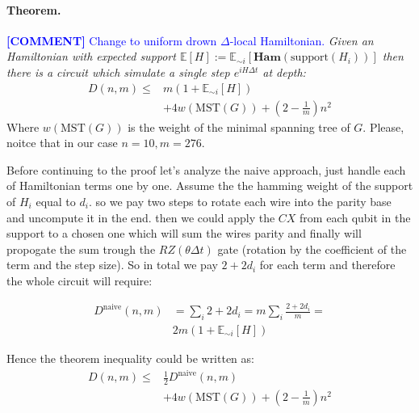 \documentclass{article}
\newcommand{\commentt}[1]{\textcolor{blue}{ \textbf{[COMMENT]} #1}}
\newcommand{\ctt}[1]{\commentt{#1}}
\begin{document}
\paragraph{Theorem.} \ctt{Change to uniform drown $\Delta$-local Hamiltonian.} \textit{ Given an Hamiltonian with expected support \(\mathbb{E}[H] := \mathbb{E}_{\sim i}\left[ \textbf{Ham}( \text{support}(H_i)) \right]\) then there is a circuit which simulate a single step \(e^{iH \Delta t}\) at depth:}
\begin{equation*}
  \begin{split}
    D\left(n,m\right) \leq & m \left( 1 + \mathbb{E}_{\sim i}[H] \right)   \\
    & + 4w \left( \text{MST}\left(G\right) \right) + \left(2 - \frac{1}{m}\right)n^2
  \end{split}    
\end{equation*}  Where  \(w \left( \text{MST}\left(G\right) \right) \) is the weight of the minimal spanning tree of \(G\). Please, noitce that in our case \(n=10, m=276\).

Before continuing to the proof let's analyze the naive approach, just handle each of Hamiltonian terms one by one. Assume the the hamming weight of the support of \(H_i\) equal to \(d_i\). so we pay two steps to rotate each wire into the parity base and uncompute it in the end. then we could apply the \(CX\) from each qubit in the support to a chosen one which will sum the wires parity and finally will propogate the sum trough the \(RZ\left(\theta \Delta t \right) \) gate (rotation by the coefficient of the term and the step size). So in total we pay \(2 + 2d_i\) for each term and therefore the whole circuit will require: 

\begin{equation*}
  \begin{split}
    D^{\text{naive}}\left(n,m\right) & = \sum_{i}{2 + 2d_i} = m\sum_{i}{\frac{2 + 2d_i}{m}} = \\ & 2m \left( 1 + \mathbb{E}_{\sim i}[H] \right)  
  \end{split}
\end{equation*}

Hence the theorem inequality could be written as:
\begin{equation*}
  \begin{split}
    D\left(n,m\right) \leq & \frac{1}{2} D^{\text{naive}} \left(n,m\right) \\ & + 4w \left( \text{MST}\left(G\right) \right) + \left(2 - \frac{1}{m}\right)n^2
  \end{split}    
\end{equation*} 
\end{document}

